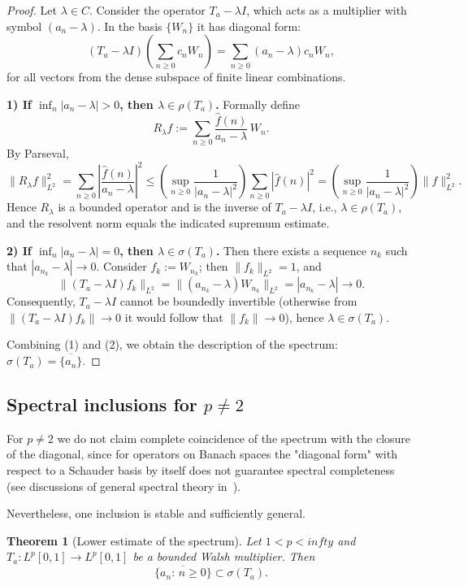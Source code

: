 \documentclass[a4paper,12pt]{article}
\newtheorem{theorem}{Theorem}[section]
\theoremstyle{definition}
\theoremstyle{remark}
\theoremstyle{definition}
\newcommand{\Lp}{L^p[0,1]}
\def\infty{infty}%
\def\mathbb#1{#1}%
\begin{document}
\begin{proof}
Let $\lambda\in\mathbb{C}$.
Consider the operator $T_a-\lambda I$, which acts as a multiplier with symbol $(a_n-\lambda)$.
In the basis $\{W_n\}$ it has diagonal form:
\[
(T_a-\lambda I)\left(\sum_{n\ge0} c_nW_n\right)=\sum_{n\ge0}(a_n-\lambda)c_nW_n,
\]
for all vectors from the dense subspace of finite linear combinations.

\smallskip
\textbf{1) If $\inf_n|a_n-\lambda|>0$, then $\lambda\in\rho(T_a)$.}
Formally define
\[
R_\lambda f:=\sum_{n\ge0}\frac{\hat{f}(n)}{a_n-\lambda}\,W_n.
\]
By Parseval,
\[
\|R_\lambda f\|_{L^2}^2=\sum_{n\ge0}\left|\frac{\hat{f}(n)}{a_n-\lambda}\right|^2
\le \left(\sup_{n\ge0}\frac{1}{|a_n-\lambda|^2}\right)\sum_{n\ge0}|\hat{f}(n)|^2
=
\left(\sup_{n\ge0}\frac{1}{|a_n-\lambda|^2}\right)\|f\|_{L^2}^2.
\]
Hence $R_\lambda$ is a bounded operator and is the inverse of $T_a-\lambda I$,
i.e., $\lambda\in\rho(T_a)$, and the resolvent norm equals the indicated supremum estimate.

\smallskip
\textbf{2) If $\inf_n|a_n-\lambda|=0$, then $\lambda\in\sigma(T_a)$.}
Then there exists a sequence $n_k$ such that $|a_{n_k}-\lambda|\to0$.
Consider $f_k:=W_{n_k}$; then $\|f_k\|_{L^2}=1$, and
\[
\|(T_a-\lambda I)f_k\|_{L^2}=\|(a_{n_k}-\lambda)W_{n_k}\|_{L^2}=|a_{n_k}-\lambda|\to0.
\]
Consequently, $T_a-\lambda I$ cannot be boundedly invertible (otherwise from $\|(T_a-\lambda I)f_k\|\to0$
it would follow that $\|f_k\|\to0$), hence $\lambda\in\sigma(T_a)$.

\smallskip
Combining (1) and (2), we obtain the description of the spectrum:
$\sigma(T_a)=\overline{\{a_n\}}$.
\end{proof}

\subsection{Spectral inclusions for $p\neq 2$}

For $p\neq2$ we do not claim complete coincidence of the spectrum with the closure of the diagonal,
since for operators on Banach spaces the "diagonal form" with respect to a Schauder basis
by itself does not guarantee spectral completeness (see discussions of general spectral theory in~\cite{Conway,DunfordSchwartz}).

Nevertheless, one inclusion is stable and sufficiently general.

\begin{theorem}[Lower estimate of the spectrum]
\label{thm:incl}
Let $1<p<\infty$ and $T_a:\Lp\to\Lp$ be a bounded Walsh multiplier.
Then
\[
\overline{\{a_n:\,n\ge 0\}}\subset \sigma(T_a).
\]
\end{theorem}
\end{document}
